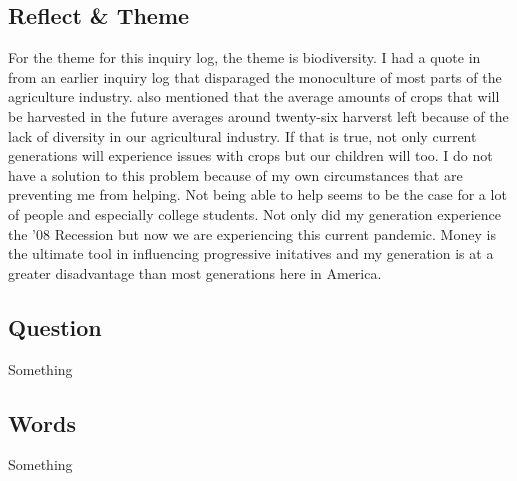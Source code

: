 \documentclass[a4paper,man,biblatex]{apa6}
\begin{document}
\subsection{Reflect \& Theme} For the theme for this inquiry log, the theme is biodiversity. I had a quote in from an earlier inquiry log that disparaged the monoculture of most parts of the agriculture industry. \textcite{dirtrich} also mentioned that the average amounts of crops that will be harvested in the future averages around twenty-six harverst left because of the lack of diversity in our agricultural industry. If that is true, not only current generations will experience issues with crops but our children will too. I do not have a solution to this problem because of my own circumstances that are preventing me from helping. Not being able to help seems to be the case for a lot of people and especially college students. Not only did my generation experience the '08 Recession but now we are experiencing this current pandemic. Money is the ultimate tool in influencing progressive initatives and my generation is at a greater disadvantage than most generations here in America. 

\subsection{Question} Something 

\subsection{Words} Something 

\printbibliography
\end{document}
